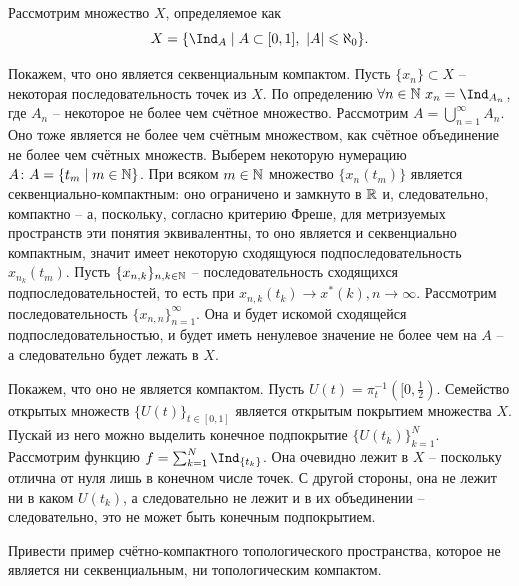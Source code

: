 \begin{solve}
    Рассмотрим множество $X$, определяемое как
    \[
        X = \{\Ind_{A} \mid A \subset [0, 1], \ |A| \leq \aleph_0\}.
    \]

    Покажем, что оно является секвенциальным компактом. Пусть $\{x_n\} \subset X$ -- некоторая последовательность точек из $X$. По определению $\forall n \in \N \ x_n = \Ind_{A_n}$, где $A_n$ -- некоторое не более чем счётное множество. Рассмотрим $A = \bigcup_{n = 1}^{\infty} A_n$. Оно тоже является не более чем счётным множеством, как счётное объединение не более чем счётных множеств. Выберем некоторую нумерацию $A\colon A = \{t_m \mid m \in \mathbb{N}\}$. При всяком $m \in \mathbb{N}$ множество $\{x_n(t_m)\}$ является секвенциально-компактным: оно ограничено и замкнуто в $\mathbb{R}$ и, следовательно, компактно -- а, поскольку, согласно критерию Фреше, для метризуемых пространств эти понятия эквивалентны, то оно является и секвенциально компактным, значит имеет некоторую сходящуюся подпоследовательность $x_{n_{k}}(t_m)$. Пусть $\{x_{n, k}\}_{n, k \in \mathbb{N}}$ -- последовательность сходящихся подпоследовательностей, то есть при $x_{n, k}(t_k) \rightarrow x^*(k), n \rightarrow \infty$. Рассмотрим последовательность $\{x_{n, n}\}_{n = 1}^{\infty}$. Она и будет искомой сходящейся подпоследовательностью, и будет иметь ненулевое значение не более чем на $A$ -- а следовательно будет лежать в $X$.

    Покажем, что оно не является компактом. Пусть $U(t) = \pi_t^{-1}([0, \frac{1}{2})$. Семейство открытых множеств $\{U(t)\}_{t \in [0, 1]}$ является открытым покрытием множества $X$. Пускай из него можно выделить конечное подпокрытие $\{U(t_k)\}_{k = 1}^{N}$. Рассмотрим функцию $f = \sum_{k = 1}^{N} \Ind_{\{t_k\}}$. Она очевидно лежит в $X$ -- поскольку отлична от нуля лишь в конечном числе точек. С другой стороны, она не лежит ни в каком $U(t_k)$, а следовательно не лежит и в их объединении -- следовательно, это не может быть конечным подпокрытием.
\end{solve}
\begin{task}[T7]
    Привести пример счётно-компактного топологического пространства, которое не является ни секвенциальным, ни топологическим компактом.
\end{task}
